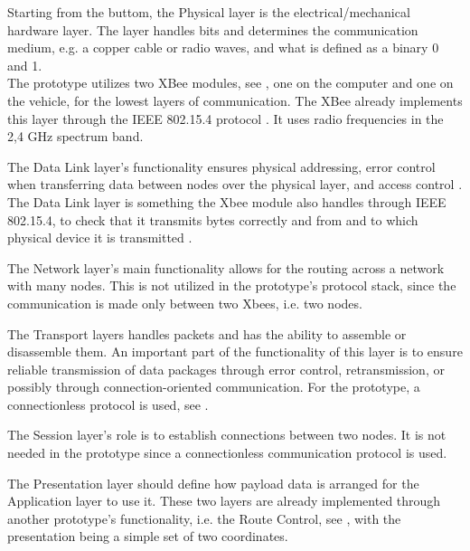 Starting from the buttom, the Physical layer is the electrical/mechanical hardware layer. The layer handles bits and determines the communication medium, e.g. a copper cable or radio waves, and what is defined as a binary 0 and 1.\\The prototype utilizes two XBee modules, see , one on the computer and one on the vehicle, for the lowest layers of communication. The XBee already implements this layer through the IEEE 802.15.4 protocol \cite{Xbee,IEEE812154}. It uses radio frequencies in the 2,4 \si{GHz} spectrum band.

The Data Link layer's functionality ensures physical addressing, error control when transferring data between nodes over the physical layer, and access control \cite{J.M.Network}. The Data Link layer is something the Xbee module also handles through IEEE 802.15.4, to check that it transmits bytes correctly and from and to which physical device it is transmitted \cite{IEEE812154}.

The Network layer's main functionality allows for the routing across a network with many nodes. This is not utilized in the prototype's protocol stack, since the communication is made only between two Xbees, i.e. two nodes.

The Transport layers handles packets and has the ability to assemble or disassemble them. An important part of the functionality of this layer is to ensure reliable transmission of data packages through error control, retransmission, or possibly through connection-oriented communication. For the prototype, a connectionless protocol is used, see .

The Session layer's role is to establish connections between two nodes. It is not needed in the prototype since a connectionless communication protocol is used.

The Presentation layer should define how payload data is arranged for the Application layer to use it. These two layers are already implemented through another prototype's functionality, i.e. the Route Control, see , with the presentation being a simple set of two coordinates.


